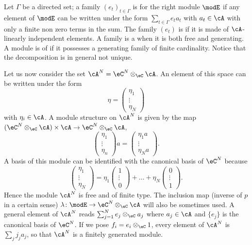 Let $\Gamma$ be a directed set; a family $(e_t)_{t\in \Gamma}$ is  for the right module $\modE$ if any element of $\modE$ can be written under the form $\sum_{t\in \Gamma}e_ta_t$ with $a_t\in\cA$ with only a finite non zero terms in the sum. The family $(e_t)$ is  if it is made of $\cA$-linearly independent elements. A family is a  when it is both free and generating. A module is of  if it possesses a generating family of finite cardinality. Notice that the decomposition is in general not unique.

Let us now consider the set $\cA^N=\eC^N\otimes_{\eC}\cA$. An element of this space can be written under the form 
\[ 
  \eta=
\begin{pmatrix}
\eta_1\\\vdots\\\eta_N
\end{pmatrix}
\]
with $\eta_i\in\cA$. A module structure on $\cA^N$ is given by the map $(\eC^N\otimes_{\eC}\cA)\times\cA\to \eC^N\otimes_{\eC}\cA$,
\[ 
  \begin{pmatrix}
\eta_1\\\vdots\\\eta_n
\end{pmatrix}a=
\begin{pmatrix}
\eta_1 a\\\vdots\\\eta_N a
\end{pmatrix}.
\]
A basis of this module can be identified with the canonical basis of $\eC^N$ because
\[ 
  \begin{pmatrix}
\eta_1\\\vdots\\\eta_N
\end{pmatrix}=\eta_1
\begin{pmatrix}
1\\\vdots\\0
\end{pmatrix}+\ldots+
\eta_N\begin{pmatrix}
0\\\vdots\\1
\end{pmatrix}.
\]
Hence the module $\cA^N$ is free and of finite type. The inclusion map (inverse of $p$ in a certain sense) $\lambda\colon \modE\to \eC^N\otimes_{\eC}\cA$\label{PgdeflambdaMod} will also be sometimes used. A general element of $\cA^N$ reads $\sum_{j=1}^{N}e_j\otimes_{\eC}a_j$ where $a_j\in\cA$ and $\{ e_j \}$ is the canonical basis of $\eC^N$. If we pose $f_i=e_i\otimes_{\eC}1$, every element of $\cA^{N}$ is $\sum_{j}j_ja_j$, so that $\cA^N$ is a finitely generated module.


